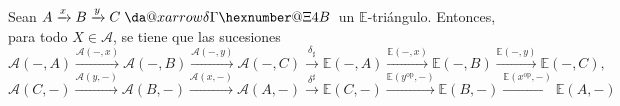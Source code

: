 \documentclass[preview]{standalone}
\makeatletter
\newcommand*{\da@xarrow}[7]{%
                                 \sbox0{$\ifx#7\scriptstyle\scriptscriptstyle\else\scriptstyle\fi#5#1#6\m@th$}%
                                 \sbox2{$\ifx#7\scriptstyle\scriptscriptstyle\else\scriptstyle\fi#5#2#6\m@th$}%
                                 \sbox4{$#7\dabar@\m@th$}%
                                 \dimen@=\wd0 %
                                 \ifdim\wd2 >\dimen@
                                   \dimen@=\wd2 %
                                 \fi
                                 \count@=2 %
                                 \def\da@bars{\dabar@\dabar@}%
                                 \@whiledim\count@\wd4<\dimen@\do{%
                                   \advance\count@\@ne
                                   \expandafter\def\expandafter\da@bars\expandafter{%
                                     \da@bars
                                     \dabar@ 
                                   }%
                                 }%
                                 \mathrel{#3}%
                                 \mathrel{%
                                   \mathop{\da@bars}\limits
                                   \ifx\\#1\\%
                                   \else
                                     _{\copy0}%
                                   \fi
                                   \ifx\\#2\\%
                                   \else
                                     ^{\copy2}%
                                   \fi
                                 }%
                                 \mathrel{#4}%
                               }
\newcommand*{\da@rightarrow}{\mathchar"0\hexnumber@\symAMSa 4B }
\newcommand*{\xdashrightarrow}[2][]{%
                                 \mathrel{%
                                   \mathpalette{\da@xarrow{#1}{#2}{}\da@rightarrow{\,}{}}{}%
                                 }%
                               }
\makeatother
\begin{document}
\begin{center}
Sean $A\xrightarrow{x} B\xrightarrow{y} C\xdashrightarrow{\delta}$ un $\mathbb{E}$-triángulo. Entonces, para todo $X\in\mathscr{A}$, se tiene que las sucesiones $$\mathscr{A}(-,A) \xrightarrow{\mathscr{A}(-,x)} \mathscr{A}(-,B) \xrightarrow{\mathscr{A}(-,y)} \mathscr{A}(-,C) \xrightarrow{\delta_\sharp} \mathbb{E}(-,A) \xrightarrow{\mathbb{E}(-,x)} \mathbb{E}(-,B) \xrightarrow{\mathbb{E}(-,y)} \mathbb{E}(-,C),$$ $$\mathscr{A}(C,-) \xrightarrow{\mathscr{A}(y,-)} \mathscr{A}(B,-) \xrightarrow{\mathscr{A}(x,-)} \mathscr{A}(A,-) \xrightarrow{\delta^\sharp} \mathbb{E}(C,-) \xrightarrow{\mathbb{E}(y^\text{op},-)} \mathbb{E}(B,-) \xrightarrow{\mathbb{E}(x^\text{op},-)} \mathbb{E}(A,-)$$
\end{center}
\end{document}
